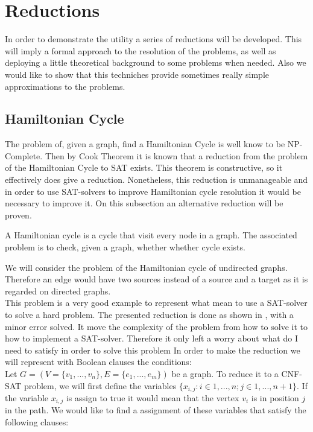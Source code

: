 \chapter{Reductions} %
\label{chap:3}

In order to demonstrate the utility a series of reductions will be developed. This will imply a formal approach to the resolution of the problems, as well as deploying a little theoretical background to some problems when needed. Also we would like to show that this techniches provide sometimes really simple approximations to the problems.

\section{Hamiltonian Cycle}


The problem of, given a graph, find a Hamiltonian Cycle is well know to be NP-Complete. Then by Cook Theorem it is known that a reduction from the problem of the Hamiltonian Cycle to SAT exists. This theorem is constructive, so it effectively does give a reduction. Nonetheless, this reduction is unmanageable and in order to use SAT-solvers to improve Hamiltonian cycle resolution it would be necessary to improve it. On this subsection an alternative reduction will be proven.

\begin{definition}
  A Hamiltonian cycle is a cycle that visit every node in a graph. The associated problem is to check, given a graph, whether whether cycle exists.
\end{definition}

We will consider the problem of the Hamiltonian cycle of undirected graphs. Therefore an edge would have two sources instead of a source and a target as it is regarded on directed graphs.\\

This problem is a very good example to represent what mean to use a SAT-solver to solve a hard problem. The presented reduction is done as shown in \cite{49593}, with a minor error solved. It move the complexity of the problem from how to solve it to how to implement a SAT-solver. Therefore it only left a worry about what do I need to satisfy in order to solve this problem In order to make the reduction we will represent with Boolean clauses the conditions:\\

Let $G=(V=\{ v_1,...,v_n\},E= \{e_1,...,e_m\})$ be a graph. To reduce it to a CNF-SAT problem, we will first define the variables $\{x_{i,j}: i\in 1,...,n ; j\in 1,...,n+1 \}$. If the variable $x_{i,j}$ is assign to true it would mean that the vertex $v_i$ is in position $j$ in the path. We would like to find a assignment of these variables that satisfy the following clauses:

